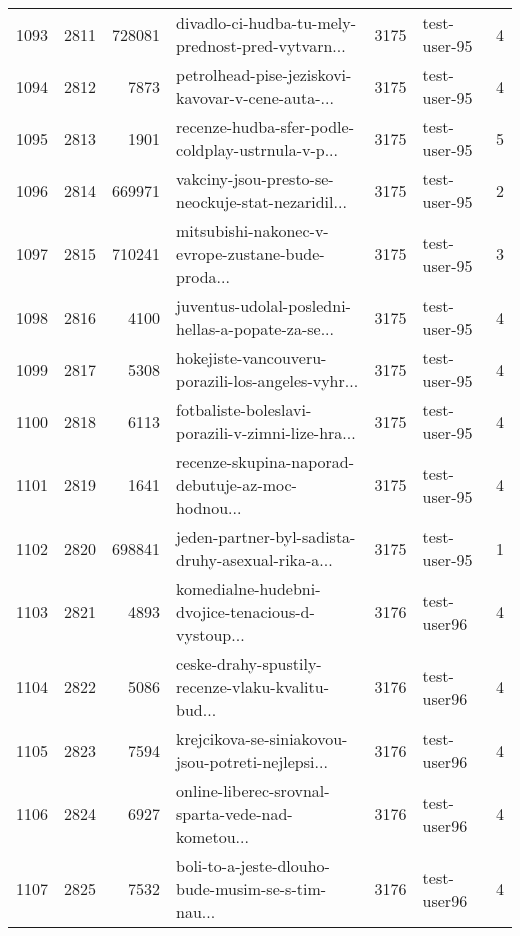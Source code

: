 \begin{tabular}{lrrlrlr}
1093 &       2811 &   728081 &  divadlo-ci-hudba-tu-mely-prednost-pred-vytvarn... &     3175 &                 test-user-95 &               4 \\
1094 &       2812 &     7873 &  petrolhead-pise-jeziskovi-kavovar-v-cene-auta-... &     3175 &                 test-user-95 &               4 \\
1095 &       2813 &     1901 &  recenze-hudba-sfer-podle-coldplay-ustrnula-v-p... &     3175 &                 test-user-95 &               5 \\
1096 &       2814 &   669971 &  vakciny-jsou-presto-se-neockuje-stat-nezaridil... &     3175 &                 test-user-95 &               2 \\
1097 &       2815 &   710241 &  mitsubishi-nakonec-v-evrope-zustane-bude-proda... &     3175 &                 test-user-95 &               3 \\
1098 &       2816 &     4100 &  juventus-udolal-posledni-hellas-a-popate-za-se... &     3175 &                 test-user-95 &               4 \\
1099 &       2817 &     5308 &  hokejiste-vancouveru-porazili-los-angeles-vyhr... &     3175 &                 test-user-95 &               4 \\
1100 &       2818 &     6113 &  fotbaliste-boleslavi-porazili-v-zimni-lize-hra... &     3175 &                 test-user-95 &               4 \\
1101 &       2819 &     1641 &  recenze-skupina-naporad-debutuje-az-moc-hodnou... &     3175 &                 test-user-95 &               4 \\
1102 &       2820 &   698841 &  jeden-partner-byl-sadista-druhy-asexual-rika-a... &     3175 &                 test-user-95 &               1 \\
1103 &       2821 &     4893 &  komedialne-hudebni-dvojice-tenacious-d-vystoup... &     3176 &                  test-user96 &               4 \\
1104 &       2822 &     5086 &  ceske-drahy-spustily-recenze-vlaku-kvalitu-bud... &     3176 &                  test-user96 &               4 \\
1105 &       2823 &     7594 &  krejcikova-se-siniakovou-jsou-potreti-nejlepsi... &     3176 &                  test-user96 &               4 \\
1106 &       2824 &     6927 &  online-liberec-srovnal-sparta-vede-nad-kometou... &     3176 &                  test-user96 &               4 \\
1107 &       2825 &     7532 &  boli-to-a-jeste-dlouho-bude-musim-se-s-tim-nau... &     3176 &                  test-user96 &               4 \\

\end{tabular}
